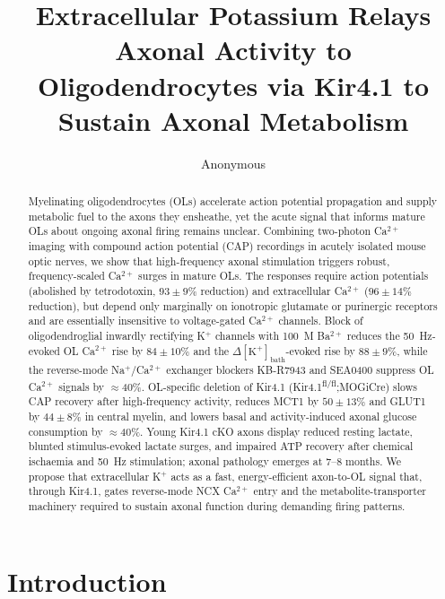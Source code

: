 \documentclass[11pt,a4paper]{article}
\title{Extracellular Potassium Relays Axonal Activity to Oligodendrocytes via Kir4.1 to Sustain Axonal Metabolism}
\author{Anonymous}
\date{}
\begin{document}
\maketitle

\begin{abstract}
\noindent
Myelinating oligodendrocytes (OLs) accelerate action potential propagation and supply metabolic fuel to the axons they ensheathe, yet the acute signal that informs mature OLs about ongoing axonal firing remains unclear. Combining two-photon Ca$^{2+}$ imaging with compound action potential (CAP) recordings in acutely isolated mouse optic nerves, we show that high-frequency axonal stimulation triggers robust, frequency-scaled Ca$^{2+}$ surges in mature OLs. The responses require action potentials (abolished by tetrodotoxin, $93 \pm 9\%$ reduction) and extracellular Ca$^{2+}$ ($96 \pm 14\%$ reduction), but depend only marginally on ionotropic glutamate or purinergic receptors and are essentially insensitive to voltage-gated Ca$^{2+}$ channels. Block of oligodendroglial inwardly rectifying K$^+$ channels with 100~\textmu M Ba$^{2+}$ reduces the 50~Hz-evoked OL Ca$^{2+}$ rise by $84 \pm 10\%$ and the $\Delta[\text{K}^+]_\text{bath}$-evoked rise by $88 \pm 9\%$, while the reverse-mode Na$^+$/Ca$^{2+}$ exchanger blockers KB-R7943 and SEA0400 suppress OL Ca$^{2+}$ signals by $\approx$40\%. OL-specific deletion of Kir4.1 (Kir4.1\textsuperscript{fl/fl};MOGiCre) slows CAP recovery after high-frequency activity, reduces MCT1 by $50 \pm 13\%$ and GLUT1 by $44 \pm 8\%$ in central myelin, and lowers basal and activity-induced axonal glucose consumption by $\approx$40\%. Young Kir4.1 cKO axons display reduced resting lactate, blunted stimulus-evoked lactate surges, and impaired ATP recovery after chemical ischaemia and 50~Hz stimulation; axonal pathology emerges at 7--8 months. We propose that extracellular K$^+$ acts as a fast, energy-efficient axon-to-OL signal that, through Kir4.1, gates reverse-mode NCX Ca$^{2+}$ entry and the metabolite-transporter machinery required to sustain axonal function during demanding firing patterns.
\end{abstract}

\section{Introduction}
\end{document}
